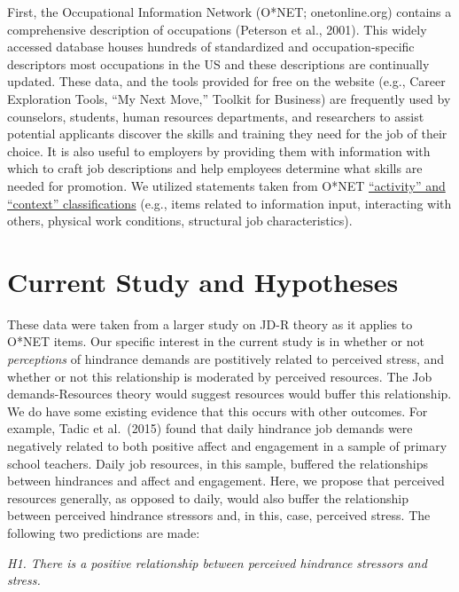 \documentclass[
  english,
  man]{apa6}
\begin{document}
First, the Occupational Information Network (O*NET; onetonline.org) contains a comprehensive description of occupations (Peterson et al., 2001). This widely accessed database houses hundreds of standardized and occupation-specific descriptors most occupations in the US and these descriptions are continually updated. These data, and the tools provided for free on the website (e.g., Career Exploration Tools, ``My Next Move,'' Toolkit for Business) are frequently used by counselors, students, human resources departments, and researchers to assist potential applicants discover the skills and training they need for the job of their choice. It is also useful to employers by providing them with information with which to craft job descriptions and help employees determine what skills are needed for promotion. We utilized statements taken from O*NET \href{https://www.O*NETonline.org/find/descriptor/result/4.A.1.b.3}{``activity'' and ``context'' classifications} (e.g., items related to information input, interacting with others, physical work conditions, structural job characteristics).

\hypertarget{current-study-and-hypotheses}{%
\section{Current Study and Hypotheses}\label{current-study-and-hypotheses}}

These data were taken from a larger study on JD-R theory as it applies to O*NET items. Our specific interest in the current study is in whether or not \emph{perceptions} of hindrance demands are postitively related to perceived stress, and whether or not this relationship is moderated by perceived resources. The Job demands-Resources theory would suggest resources would buffer this relationship. We do have some existing evidence that this occurs with other outcomes. For example, Tadic et al.~(2015) found that daily hindrance job demands were negatively related to both positive affect and engagement in a sample of primary school teachers. Daily job resources, in this sample, buffered the relationships between hindrances and affect and engagement. Here, we propose that perceived resources generally, as opposed to daily, would also buffer the relationship between perceived hindrance stressors and, in this, case, perceived stress. The following two predictions are made:

\emph{H1. There is a positive relationship between perceived hindrance stressors and stress.}
\end{document}
